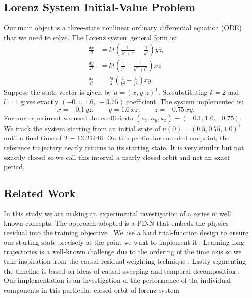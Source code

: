 \documentclass[conference]{IEEEtran}
\begin{document}
\subsection{Lorenz System Initial-Value Problem}
Our main object is a three-state nonlinear ordinary differential equation (ODE) that we need to solve. The Lorenz system general form \cite{matthews2024pinnde} is:
\begin{equation}
\begin{aligned}
\frac{dx}{dt} &= kl\left(\frac{1}{k^2 + l^2} - \frac{1}{k^2}\right) yz,\\
\frac{dy}{dt} &= kl\left(\frac{1}{l^2} - \frac{1}{k^2 + l^2}\right) xz,\\
\frac{dz}{dt} &= \frac{kl}{2}\left(\frac{1}{k^2} - \frac{1}{l^2}\right) xy.
\end{aligned}
\label{eq:lorenz1960}
\end{equation}
Suppose the state vector is given by $u=(x,y,z)^\mathsf{T}$. So,substituting $k=2$ and $l=1$ gives exactly $(-0.1,\,1.6,\,-0.75)$ coefficient. The system implemented is:
\begin{equation}
\dot{x}=-0.1\,yz,\qquad \dot{y}=1.6\,xz,\qquad \dot{z}=-0.75\,xy,
\label{eq:ode}
\end{equation}
For our experiment we used the coefficients $(a_x,a_y,a_z)=(-0.1,1.6,-0.75)$. We track the system starting from an initial state \cite{matthews2024pinnde} of $u(0)=(0.5,0.75,1.0)^\mathsf{T}$ until a final time of $T=13.26446$. On this particular rounded endpoint, the reference trajectory nearly returns to its starting state. It is very similar but not exactly closed so we call this interval a nearly closed orbit and not an exact period.


\subsection{Related Work}
In this study we are making an experimental investigation of a series of well known concepts. The approach adopted is a PINN that embeds the physics residual into the training objective \cite{raissi2019}. We use a hard trial-function design \cite{lagaris1998} to ensure our starting state precisely at the point we want to implement it . Learning long trajectories is a well-known challenge due to the ordering of the time axis so we take inspiration from the causal residual weighting technique \cite{wang2024causal}. Lastly segmenting the timeline is based on ideas of causal sweeping and temporal decomposition \cite{penwarden2023}. Our implementation is an investigation of the performance of the individual components in this particular closed orbit of lorenz system.
\end{document}
